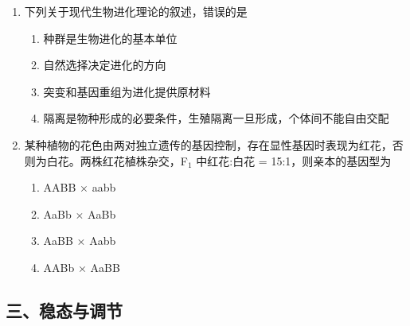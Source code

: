\begin{enumerate}
  \item[★★] 下列关于现代生物进化理论的叙述，错误的是
  \begin{enumerate}
    \item[A.] 种群是生物进化的基本单位
    \item[B.] 自然选择决定进化的方向
    \item[C.] 突变和基因重组为进化提供原材料
    \item[D.] 隔离是物种形成的必要条件，生殖隔离一旦形成，个体间不能自由交配
  \end{enumerate}
  \vspace{0.8cm}

  \item[★★★] 某种植物的花色由两对独立遗传的基因控制，存在显性基因时表现为红花，否则为白花。两株红花植株杂交，F$_1$ 中红花:白花 = 15:1，则亲本的基因型为
  \begin{enumerate}
    \item[A.] AABB $\times$ aabb
    \item[B.] AaBb $\times$ AaBb
    \item[C.] AaBB $\times$ Aabb
    \item[D.] AABb $\times$ AaBB
  \end{enumerate}
  \vspace{1cm}
\end{enumerate}

\subsection{三、稳态与调节}

